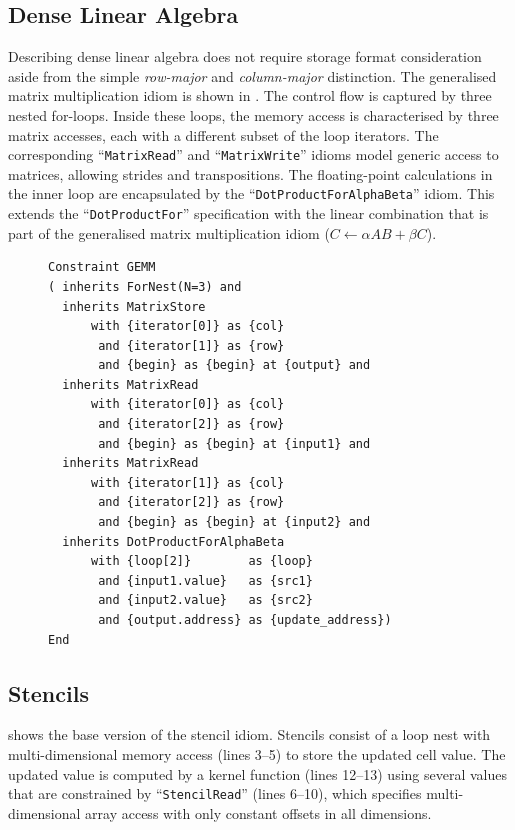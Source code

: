 \subsection{Dense Linear Algebra}

    Describing dense linear algebra does not require storage format
    consideration aside from the simple {\it row-major} and {\it column-major}
    distinction.
    The generalised matrix multiplication idiom is shown in .
    The control flow is captured by three nested for-loops.
    Inside these loops, the memory access is characterised by three matrix
    accesses, each with a different subset of the loop iterators.
    The corresponding ``{\tt MatrixRead}'' and ``{\tt MatrixWrite}'' idioms
    model generic access to matrices, allowing strides and transpositions.
    The floating-point calculations in the inner loop are encapsulated by
    the ``{\tt DotProductForAlphaBeta}'' idiom.
    This extends the ``{\tt DotProductFor}'' specification with the linear
    combination that is part of the generalised matrix multiplication idiom
    ($C\gets\alpha AB+\beta C$).

\begin{figure}[H]
\begin{lstlisting}[language=IDL, label={fig:gemm}, caption=
   {IDL specification of the generalised dense matrix-vector multiplication
    (GEMM)\leftskip=0pt\rightskip=0pt}]
Constraint GEMM
( inherits ForNest(N=3) and
  inherits MatrixStore
      with {iterator[0]} as {col}
       and {iterator[1]} as {row}
       and {begin} as {begin} at {output} and
  inherits MatrixRead
      with {iterator[0]} as {col}
       and {iterator[2]} as {row}
       and {begin} as {begin} at {input1} and
  inherits MatrixRead
      with {iterator[1]} as {col}
       and {iterator[2]} as {row}
       and {begin} as {begin} at {input2} and
  inherits DotProductForAlphaBeta
      with {loop[2]}        as {loop}
       and {input1.value}   as {src1}
       and {input2.value}   as {src2}
       and {output.address} as {update_address})
End
\end{lstlisting}
\end{figure}

\subsection{Stencils}

     shows the base version of the stencil idiom.
    Stencils consist of a loop nest with multi-dimensional memory access
    (lines 3--5) to store the updated cell value.
    The updated value is computed by a kernel function (lines 12--13) using
    several values that are constrained by ``{\tt StencilRead}'' (lines 6--10),
    which specifies multi-dimensional array access with only constant offsets in
    all dimensions.

